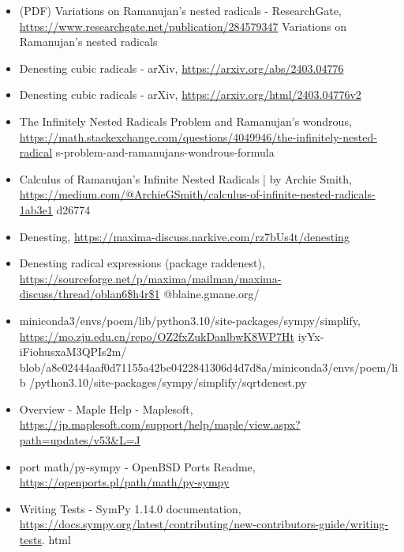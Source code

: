 \documentclass[10pt]{article}
\begin{document}
\begin{itemize}
  \item[18.] (PDF) Variations on Ramanujan's nested radicals - ResearchGate, \href{https://www.researchgate.net/publication/284579347}{https://www.researchgate.net/publication/284579347} Variations on Ramanujan's nested radicals
  \item[19.] [2403.04776] Denesting cubic radicals - arXiv, \href{https://arxiv.org/abs/2403.04776}{https://arxiv.org/abs/2403.04776}
  \item[20.] Denesting cubic radicals - arXiv, \href{https://arxiv.org/html/2403.04776v2}{https://arxiv.org/html/2403.04776v2}
  \item[21.] The Infinitely Nested Radicals Problem and Ramanujan's wondrous, \href{https://math.stackexchange.com/questions/4049946/the-infinitely-nested-radical}{https://math.stackexchange.com/questions/4049946/the-infinitely-nested-radical} s-problem-and-ramanujans-wondrous-formula
  \item[22.] Calculus of Ramanujan's Infinite Nested Radicals | by Archie Smith, \href{https://medium.com/@ArchieGSmith/calculus-of-infinite-nested-radicals-1ab3e1}{https://medium.com/@ArchieGSmith/calculus-of-infinite-nested-radicals-1ab3e1} d26774
  \item[23.] [Maxima-discuss] Denesting, \href{https://maxima-discuss.narkive.com/rz7bUs4t/denesting}{https://maxima-discuss.narkive.com/rz7bUs4t/denesting}
  \item[24.] [Maxima-discuss] Denesting radical expressions (package raddenest), \href{https://sourceforge.net/p/maxima/mailman/maxima-discuss/thread/oblan6$h4r$1}{https://sourceforge.net/p/maxima/mailman/maxima-discuss/thread/oblan6\$h4r\$1} @blaine.gmane.org/
  \item[25.] miniconda3/envs/poem/lib/python3.10/site-packages/sympy/simplify, \href{https://mo.zju.edu.cn/repo/OZ2fxZukDanlbwK8WP7Ht}{https://mo.zju.edu.cn/repo/OZ2fxZukDanlbwK8WP7Ht} iyYx-iFiohusxaM3QPIs2m/ blob/a8e02444aaf0d71155a42be0422841306d4d7d8a/miniconda3/envs/poem/lib /python3.10/site-packages/sympy/simplify/sqrtdenest.py
  \item[26.] Overview - Maple Help - Maplesoft, \href{https://jp.maplesoft.com/support/help/maple/view.aspx?path=updates/v53&L=J}{https://jp.maplesoft.com/support/help/maple/view.aspx?path=updates/v53\&L=J}
  \item[27.] port math/py-sympy - OpenBSD Ports Readme, \href{https://openports.pl/path/math/py-sympy}{https://openports.pl/path/math/py-sympy}
  \item[28.] Writing Tests - SymPy 1.14.0 documentation, \href{https://docs.sympy.org/latest/contributing/new-contributors-guide/writing-tests}{https://docs.sympy.org/latest/contributing/new-contributors-guide/writing-tests}. html
\end{itemize}
\end{document}
